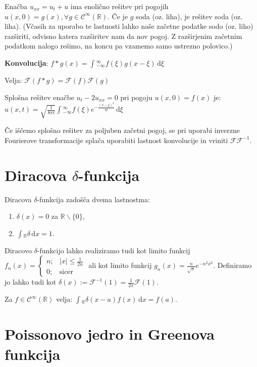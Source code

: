 \documentclass[10pt,a4paper]{amsart}
\theoremstyle{definition} %
\theoremstyle{plain} %
\newcommand{\dx}{\ensuremath{\,\mathrm{d}x}}
\newcommand{\dxi}{\ensuremath{\,\mathrm{d}\xi}}
\let\oldint\int
\renewcommand{\int}{\oldint \!}
\newcommand{\R}{\mathbb R}
\newcommand{\F}{\mathcal{F}}
\newcommand{\Cont}{\mathcal{C}}
\begin{document}
Enačba $u_{xx} = u_t + u$ ima enolično rešitev pri pogojih $u(x,0)=g(x), \forall g \in \Cont^\infty (\R)$. Če je $g$ soda (oz. liha), je rešitev soda (oz. liha). (Včasih za uporabo te lastnosti lahko naše začetne podatke sodo (oz. liho) razširiti, odvisno katera razširitev nam da nov pogoj. Z razširjenim začetnim podatkom nalogo rešimo, na koncu pa vzamemo samo ustrezno polovico.)

\textbf{Konvolucija}: $f \ast g (x) = \int_{-\infty}^\infty f(\xi) g(x-\xi) \dxi$

Velja: $\F (f \ast g) = \F(f) \F (g)$

Splošna rešitev enačbe $u_t - 2u_{xx} = 0$ pri pogoju $u(x,0) = f(x)$ je: $u(x,t) = \sqrt{ \frac{1}{8 \pi t}} \int_{-\infty}^\infty f(\xi) e^{- \frac{(x- \xi )^2}{8t}} \dxi$

Če iščemo splošno rešitev za poljuben začetni pogoj, se pri uporabi inverzne Fourierove transformacije splača uporabiti lastnost konvolucije in vriniti $\F \F^{-1}$.


\vspace{-0.4cm}
\section*{Diracova $\delta$-funkcija}

Diracova $\delta$-funkcija zadošča dvema lastnostma:
\begin{enumerate}

\item $\delta (x) = 0$ za $\R \backslash \{0\}$,

\item $\int_\R \delta \dx = 1$.

\end{enumerate}

Diracovo $\delta$-funkcijo lahko realiziramo tudi kot limito funkcij $f_n (x) = \begin{cases} n;& |x| \leq \frac{1}{2n} \\ 0;& \text{sicer}\end{cases}$ ali kot limito funkcij $g_n(x) = \frac{n}{\sqrt{\pi}} e^{-n^2x^2}$. Definiramo jo lahko tudi kot $\delta (x) := \F^{-1}(1) = \frac{1}{2\pi} \F (1)$.

Za $f \in \Cont^\infty (\R)$ velja: $\int_\R \delta (x-a) f(x) \dx = f(a)$.

\section*{Poissonovo jedro in Greenova funkcija}
\end{document}
